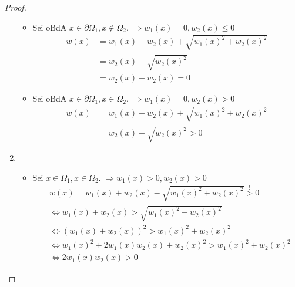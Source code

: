 \begin{proof}
\begin{enumerate}
\begin{itemize}
\item
Sei \ac{oBdA} $x \in \partial \Omega_1, x \notin \Omega_2$. $\Rightarrow w_1(x) = 0, w_2(x) \leq 0$
\begin{align*}
w(x) &=  w_1(x) + w_2(x) + \sqrt{w_1(x)^2 + w_2(x)^2}\\
&= w_2(x) + \sqrt{w_2(x)^2} \\
&= w_2(x) - w_2(x) = 0
\end{align*}

\item
Sei \ac{oBdA} $x \in \partial \Omega_1, x \in \Omega_2$. $\Rightarrow w_1(x) = 0, w_2(x) > 0$
\begin{align*}
w(x) &= w_1(x) + w_2(x) + \sqrt{w_1(x)^2 + w_2(x)^2} \\
&= w_2(x) + \sqrt{w_2(x)^2} > 0
\end{align*}
\end{itemize}

\item
\begin{itemize}
\item
Sei $x \in \Omega_1, x \in \Omega_2$. $\Rightarrow w_1(x) >0, w_2(x) >0$
\begin{align*}
&w(x) = w_1(x) + w_2(x) - \sqrt{w_1(x)^2 + w_2(x)^2} \overset{!}{>}0\\
&\Leftrightarrow w_1(x) + w_2(x) > \sqrt{w_1(x)^2 + w_2(x)^2}\\
&\Leftrightarrow (w_1(x) + w_2(x))^2 > w_1(x)^2 + w_2(x)^2\\
&\Leftrightarrow w_1(x)^2 + 2w_1(x) w_2(x) + w_2(x)^2 > w_1(x)^2 + w_2(x)^2\\
&\Leftrightarrow 2w_1(x) w_2(x) >0
\end{align*}


\end{itemize}
\end{enumerate}
\end{proof}
